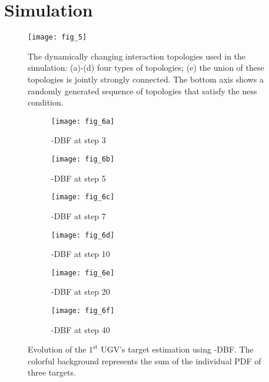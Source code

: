 \section{Simulation}\label{sec:sim}

	\begin{figure}		
		\texttt{[image: fig\_5]}
		\caption{The dynamically changing interaction topologies used in the simulation: (a)-(d) four types of topologies; (e) the union of these topologies is jointly strongly connected. The bottom axis shows a randomly generated sequence of topologies that satisfy the \fc ness condition.}\label{fig:com_topo}		
	\end{figure}		
			
			
	\begin{figure}%
		\centering		
		\begin{subfigure}[b]{0.23\textwidth}
			\texttt{[image: fig\_6a]}
			\caption{\proto-DBF at step 3}\label{fig:step3}
		\end{subfigure}
		\begin{subfigure}[b]{0.23\textwidth}
			\texttt{[image: fig\_6b]}
			\caption{\proto-DBF at step 5}\label{fig:step5}
		\end{subfigure}
		\begin{subfigure}[b]{0.23\textwidth}
			\texttt{[image: fig\_6c]}
			\caption{\proto-DBF at step 7}\label{fig:step7}
		\end{subfigure}
		\begin{subfigure}[b]{0.23\textwidth}
			\texttt{[image: fig\_6d]}
			\caption{\proto-DBF at step 10}\label{fig:step10}
		\end{subfigure}
		\begin{subfigure}[b]{0.23\textwidth}
			\texttt{[image: fig\_6e]}
			\caption{\proto-DBF at step 20}\label{fig:step20}
		\end{subfigure}	
		\begin{subfigure}[b]{0.23\textwidth}
			\texttt{[image: fig\_6f]}
			\caption{\proto-DBF at step 40}\label{fig:step40}
		\end{subfigure}			
		\caption{Evolution of the $1^\text{st}$ UGV's target estimation using \proto-DBF. The colorful background represents the sum of the individual PDF of three targets.}
		\label{fig:mov_sen_mov_tar1}
	\end{figure}
	
